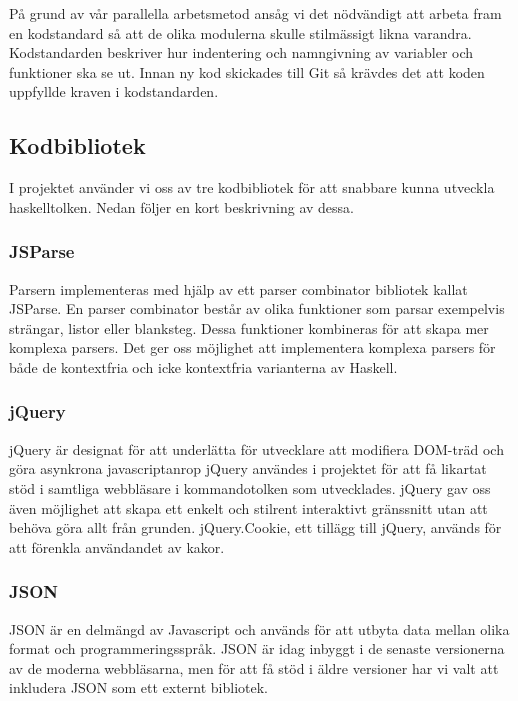 På grund av vår parallella arbetsmetod ansåg vi det nödvändigt att arbeta fram en kodstandard så att de olika modulerna skulle stilmässigt likna varandra. Kodstandarden beskriver hur indentering och namngivning av variabler och funktioner ska se ut. Innan ny kod skickades till Git så krävdes det att koden uppfyllde kraven i kodstandarden.  


\subsection{Kodbibliotek}
I projektet använder vi oss av tre kodbibliotek för att snabbare kunna utveckla haskelltolken. Nedan följer en kort beskrivning av dessa.

\subsubsection{JSParse}  
Parsern implementeras med hjälp av ett parser combinator bibliotek kallat JSParse. 
En parser combinator består av olika funktioner som parsar exempelvis strängar, listor eller blanksteg.
Dessa funktioner kombineras för att skapa mer komplexa parsers. Det ger oss möjlighet att implementera komplexa
parsers för både de kontextfria och icke kontextfria varianterna av Haskell.

\subsubsection{jQuery} 
jQuery är designat för att underlätta för utvecklare att modifiera DOM-träd och göra asynkrona javascriptanrop jQuery användes i projektet för att få likartat stöd i samtliga webbläsare i kommandotolken som utvecklades. 
jQuery gav oss även möjlighet att skapa ett enkelt och stilrent interaktivt gränssnitt utan att behöva göra allt från grunden.
jQuery.Cookie, ett tillägg till jQuery, används för att förenkla användandet av kakor.

\subsubsection{JSON}
JSON \citep{json}  är en delmängd av Javascript och används för att utbyta data mellan olika format och programmeringsspråk. 
JSON är idag inbyggt i de senaste versionerna av de moderna webbläsarna, men för att få stöd i äldre versioner har vi valt att inkludera JSON som ett externt bibliotek.

